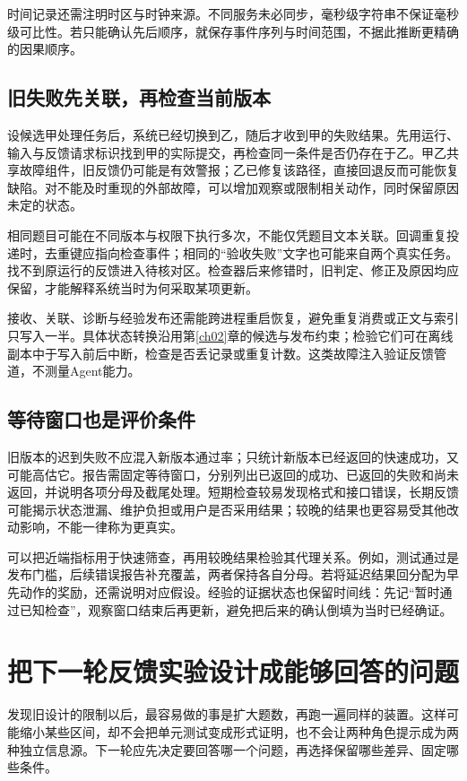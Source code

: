 时间记录还需注明时区与时钟来源。不同服务未必同步，毫秒级字符串不保证毫秒级可比性。若只能确认先后顺序，就保存事件序列与时间范围，不据此推断更精确的因果顺序。

\subsection{旧失败先关联，再检查当前版本}

设候选甲处理任务后，系统已经切换到乙，随后才收到甲的失败结果。先用运行、输入与反馈请求标识找到甲的实际提交，再检查同一条件是否仍存在于乙。甲乙共享故障组件，旧反馈仍可能是有效警报；乙已修复该路径，直接回退反而可能恢复缺陷。对不能及时重现的外部故障，可以增加观察或限制相关动作，同时保留原因未定的状态。

相同题目可能在不同版本与权限下执行多次，不能仅凭题目文本关联。回调重复投递时，去重键应指向检查事件；相同的“验收失败”文字也可能来自两个真实任务。找不到原运行的反馈进入待核对区。检查器后来修错时，旧判定、修正及原因均应保留，才能解释系统当时为何采取某项更新。

接收、关联、诊断与经验发布还需能跨进程重启恢复，避免重复消费或正文与索引只写入一半。具体状态转换沿用第\ref{ch02}章的候选与发布约束；检验它们可在离线副本中于写入前后中断，检查是否丢记录或重复计数。这类故障注入验证反馈管道，不测量Agent能力。

\subsection{等待窗口也是评价条件}

旧版本的迟到失败不应混入新版本通过率；只统计新版本已经返回的快速成功，又可能高估它。报告需固定等待窗口，分别列出已返回的成功、已返回的失败和尚未返回，并说明各项分母及截尾处理。短期检查较易发现格式和接口错误，长期反馈可能揭示状态泄漏、维护负担或用户是否采用结果；较晚的结果也更容易受其他改动影响，不能一律称为更真实。

可以把近端指标用于快速筛查，再用较晚结果检验其代理关系。例如，测试通过是发布门槛，后续错误报告补充覆盖，两者保持各自分母。若将延迟结果回分配为早先动作的奖励，还需说明对应假设。经验的证据状态也保留时间线：先记“暂时通过已知检查”，观察窗口结束后再更新，避免把后来的确认倒填为当时已经确证。

\section{把下一轮反馈实验设计成能够回答的问题}
\label{sec:ch04-design}

发现旧设计的限制以后，最容易做的事是扩大题数，再跑一遍同样的装置。这样可能缩小某些区间，却不会把单元测试变成形式证明，也不会让两种角色提示成为两种独立信息源。下一轮应先决定要回答哪一个问题，再选择保留哪些差异、固定哪些条件。

